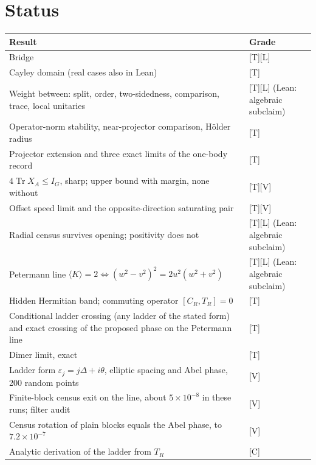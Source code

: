 \documentclass[11pt]{article}
\theoremstyle{definition}
\newcommand{\grade}[1]{\textsf{\small[#1]}}
\newcommand{\Tr}{\operatorname{Tr}}
\begin{document}
\section{Status}\label{sec:status}
\begin{center}\small
\begin{tabular}{p{}l}\toprule
Result & Grade\\\midrule
Bridge & \grade{T}\grade{L}\\
Cayley domain (real cases also in Lean) & \grade{T}\\
Weight between: split, order, two-sidedness, comparison, trace, local unitaries & \grade{T}\grade{L} (Lean: algebraic subclaim)\\
Operator-norm stability, near-projector comparison, Hölder radius & \grade{T}\\
Projector extension and three exact limits of the one-body record & \grade{T}\\
$4\Tr X_A\le I_G$, sharp; upper bound with margin, none without & \grade{T}\grade{V}\\
Offset speed limit and the opposite-direction saturating pair & \grade{T}\grade{V}\\
Radial census survives opening; positivity does not & \grade{T}\grade{L} (Lean: algebraic subclaim)\\
Petermann line $\langle K\rangle=2\iff(w^2-v^2)^2=2u^2(w^2+v^2)$ & \grade{T}\grade{L} (Lean: algebraic subclaim)\\
Hidden Hermitian band; commuting operator $[C_R,T_R]=0$ & \grade{T}\\
Conditional ladder crossing (any ladder of the stated form) and exact crossing of the proposed phase on the Petermann line & \grade{T}\\
Dimer limit, exact & \grade{T}\\
Ladder form $\varepsilon_j=j\Delta+i\theta$, elliptic spacing and Abel phase, 200 random points & \grade{V}\\
Finite-block census exit on the line, about $5\times10^{-8}$ in these runs; filter audit & \grade{V}\\
Census rotation of plain blocks equals the Abel phase, to $7.2\times10^{-7}$ & \grade{V}\\
Analytic derivation of the ladder from $T_R$ & \grade{C}\\\bottomrule
\end{tabular}
\end{center}
\end{document}
